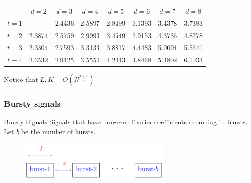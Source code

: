 \documentclass[10pt,xcolor=table]{beamer}
\begin{document}
\begin{frame}
\begin{block}{}
\vspace{-6mm}
\color{black}
\begin{table}[ht]
\centering
\begin{tabular}{c|ccccccc}
\hline
& $d=2$ & $d=3$ & $d=4$ & $d=5$ & $d=6$ & $d=7$ & $d=8$ \\
\hline
\rowcolor{lightgray}
$t=1$& \ & 2.4436 & 2.5897 & 2.8499 & 3.1393 & 3.4378 & 3.7383 \\
$t=2$& 2.3874 & 2.5759 & 2.9993 & 3.4549 & 3.9153 & 4.3736 & 4.8278 \\
\rowcolor{lightgray}
$t=3$& 2.3304 & 2.7593 & 3.3133 & 3.8817 & 4.4483 & 5.0094 & 5.5641 \\
$t=4$& 2.3532 & 2.9125 & 3.5556& 4.2043 & 4.8468 & 5.4802 & 6.1033 \\

\hline
\end{tabular}
\end{table}
\vspace{-3mm}

Notice that $L,K = O \left( N^{\frac{1-d}{d}}\right)$
\end{block}

\end{frame}



\begin{frame}\frametitle{Bursty signals}
\begin{block}{Bursty Signals}
Signals that have non-zero Fourier coefficients occurring in bursts. Let $b$ be the number of bursts.
\end{block}

\begin{figure}[t]
\centering
\includegraphics[width=3.0in]{burst_spacing}
\end{figure}

\end{frame}
\end{document}
